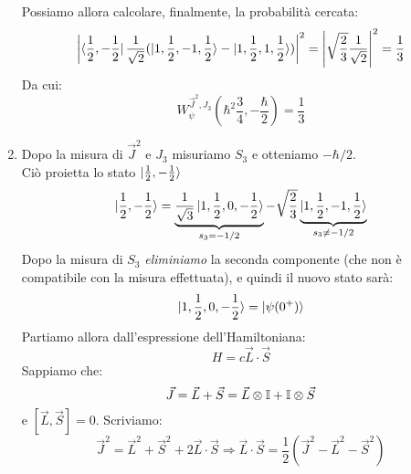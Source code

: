 \documentclass[../../FisicaTeorica.tex]{subfiles}
\begin{document}
\begin{enumerate}
Possiamo allora calcolare, finalmente, la probabilità cercata:
\begin{align*}
\left|\bra{\frac{1}{2},-\frac{1}{2}}\frac{1}{\sqrt{2}}(\ket{1,\frac{1}{2},-1,\frac{1}{2}}-\ket{1,\frac{1}{2},1,\frac{1}{2}})\right|^2 =
\left|\sqrt{\frac{2}{3}}\frac{1}{\sqrt{2}} \right|^2=\frac{1}{3}
\end{align*}
Da cui:
\[
W_\psi^{\vec{J}^2,J_3}(\hbar^2\frac{3}{4},-\frac{\hbar}{2})=\frac{1}{3}
\]
\item Dopo la misura di $\vec{J}^2$ e $J_3$ misuriamo $S_3$ e otteniamo $-\hbar/2$.\\ Ciò proietta lo stato $\ket{\frac{1}{2},-\frac{1}{2}}$
\[
\ket{\frac{1}{2},-\frac{1}{2}}=\underbrace{\frac{1}{\sqrt{3}}\ket{1,\frac{1}{2},0,-\frac{1}{2}}}_{s_3=-1/2}-\sqrt{\frac{2}{3}}\underbrace{\ket{1,\frac{1}{2},-1, \frac{1}{2}}}_{s_3 \neq -1/2}
\]
Dopo la misura di $S_3$ \textit{eliminiamo} la seconda componente (che non è compatibile con la misura effettuata), e quindi il nuovo stato sarà:
\[
\ket{1,\frac{1}{2},0,-\frac{1}{2}}=\ket{\psi(0^+)}
\]
Partiamo allora dall'espressione dell'Hamiltoniana:
\[
H=c\vec{L}\cdot \vec{S}
\]
Sappiamo che:
\[
\vec{J}=\vec{L}+\vec{S} = \vec{L}\otimes \mathbb{I} + \mathbb{I}\otimes \vec{S}
\]
e $[\vec{L},\vec{S}]=0$. Scriviamo:
\[
\vec{J}^2 = \vec{L}^2 + \vec{S}^2 + 2\vec{L}\cdot \vec{S} \Rightarrow  \vec{L}\cdot\vec{S} = \frac{1}{2}\left(\vec{J}^2 - \vec{L}^2 -\vec{S}^2 \right)
\]


\end{enumerate}
\end{document}
